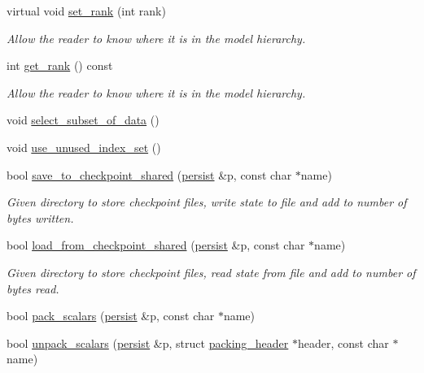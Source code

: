 \begin{DoxyCompactItemize}
virtual void \hyperlink{classlbann_1_1generic__data__reader_a8515fb4ffbeaa89fd8459b66b9ba358f}{set\+\_\+rank} (int rank)
\begin{DoxyCompactList}\small\item\em Allow the reader to know where it is in the model hierarchy. \end{DoxyCompactList}\item 
int \hyperlink{classlbann_1_1generic__data__reader_ab5321bd7c6e83845785753366e6d9e64}{get\+\_\+rank} () const
\begin{DoxyCompactList}\small\item\em Allow the reader to know where it is in the model hierarchy. \end{DoxyCompactList}\item 
void \hyperlink{classlbann_1_1generic__data__reader_aa28fdeeb6af492540f507e49adff5d6c}{select\+\_\+subset\+\_\+of\+\_\+data} ()
\item 
void \hyperlink{classlbann_1_1generic__data__reader_afa621af16f1a582b5a22405b79dbe052}{use\+\_\+unused\+\_\+index\+\_\+set} ()
\item 
bool \hyperlink{classlbann_1_1generic__data__reader_a6f49d945610f35335fce4a422a432cc1}{save\+\_\+to\+\_\+checkpoint\+\_\+shared} (\hyperlink{classlbann_1_1persist}{persist} \&p, const char $\ast$name)
\begin{DoxyCompactList}\small\item\em Given directory to store checkpoint files, write state to file and add to number of bytes written. \end{DoxyCompactList}\item 
bool \hyperlink{classlbann_1_1generic__data__reader_a85119fae17feb8fda32f8a2f40869436}{load\+\_\+from\+\_\+checkpoint\+\_\+shared} (\hyperlink{classlbann_1_1persist}{persist} \&p, const char $\ast$name)
\begin{DoxyCompactList}\small\item\em Given directory to store checkpoint files, read state from file and add to number of bytes read. \end{DoxyCompactList}\item 
bool \hyperlink{classlbann_1_1generic__data__reader_a93dddd2276ddc34cc97922ee27c44582}{pack\+\_\+scalars} (\hyperlink{classlbann_1_1persist}{persist} \&p, const char $\ast$name)
\item 
bool \hyperlink{classlbann_1_1generic__data__reader_a8de5c2e24d4cc2211145ed5dc37cf228}{unpack\+\_\+scalars} (\hyperlink{classlbann_1_1persist}{persist} \&p, struct \hyperlink{structlbann_1_1generic__data__reader_1_1packing__header}{packing\+\_\+header} $\ast$header, const char $\ast$name)

\end{DoxyCompactItemize}
